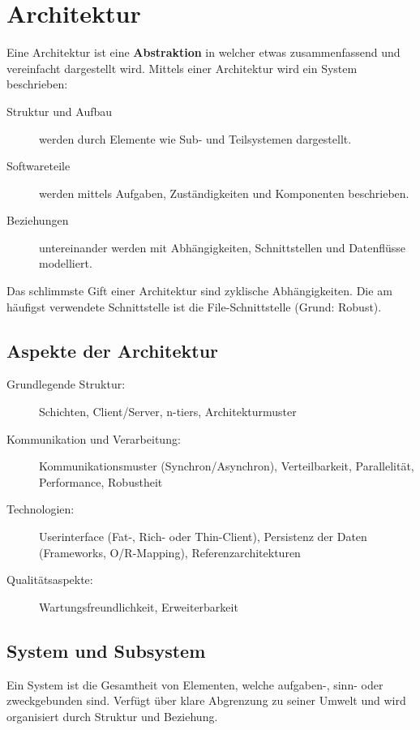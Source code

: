 \section{Architektur}
Eine Architektur ist eine \textbf{Abstraktion} in welcher etwas zusammenfassend und vereinfacht dargestellt wird. Mittels einer Architektur wird ein System beschrieben:

\begin{description}
	\item[Struktur und Aufbau] werden durch Elemente wie Sub- und Teilsystemen dargestellt.
	\item[Softwareteile] werden mittels Aufgaben, Zuständigkeiten und Komponenten beschrieben.
	\item [Beziehungen] untereinander werden mit Abhängigkeiten, Schnittstellen und Datenflüsse modelliert.
\end{description}

Das schlimmste Gift einer Architektur sind zyklische Abhängigkeiten. Die am häufigst verwendete Schnittstelle ist die File-Schnittstelle (Grund: Robust).

\subsection{Aspekte der Architektur}
\begin{description}
	\item[Grundlegende Struktur:] Schichten, Client/Server, n-tiers, Architekturmuster
	\item[Kommunikation und Verarbeitung:] Kommunikationsmuster (Synchron/Asynchron), Verteilbarkeit, Parallelität, Performance, Robustheit
	\item[Technologien:] Userinterface (Fat-, Rich- oder Thin-Client), Persistenz der Daten (Frameworks, O/R-Mapping), Referenzarchitekturen
	\item[Qualitätsaspekte:] Wartungsfreundlichkeit, Erweiterbarkeit
\end{description}

\subsection{System und Subsystem}
Ein System ist die Gesamtheit von Elementen, welche aufgaben-, sinn- oder zweckgebunden sind. Verfügt über klare Abgrenzung zu seiner Umwelt und wird organisiert durch Struktur und Beziehung.

